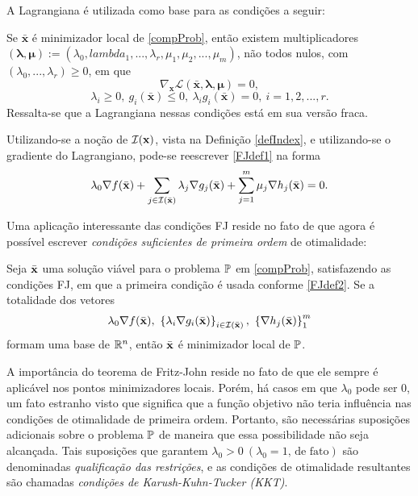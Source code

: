 A Lagrangiana \'{e} utilizada como base para as condi\c{c}\~{o}es a seguir:

\begin{theorem}
Se $\bar{\mathbf{x}}$ \'{e} minimizador local de \eqref{compProb}, ent\~{a}o existem multiplicadores $(\mathbf{\lambda,\mu}) := (\lambda_0,lambda_1,...,\lambda_r,\mu_1,\mu_2,...,\mu_m)$, n\~{a}o todos nulos, com $(\lambda_0,...,\lambda_r) \ge 0$, em que
\begin{equation}
\label{FJdef1}
\nabla_{\mathbf{x}} \mathcal{L}(\bar{\mathbf{x}},\mathbf{\lambda},\mathbf{\mu}) = 0,
\end{equation}
\begin{equation}
\lambda_i \ge 0,~ g_i(\bar{\mathbf{x}}) \le 0,~ \lambda_i g_i(\bar{\mathbf{x}}) = 0,~i = 1,2,...,r.
\end{equation}
Ressalta-se que a Lagrangiana nessas condi\c{c}\~{o}es est\'{a} em sua vers\~{a}o fraca.
\end{theorem}

Utilizando-se a no\c{c}\~{a}o de $\mathcal{I}(\mathbf{x})$, vista na Defini\c{c}\~{a}o \ref{defIndex}, e utilizando-se o gradiente do Lagrangiano, pode-se reescrever \eqref{FJdef1} na forma
\begin{equation}
\label{FJdef2}
\lambda_0 \nabla f(\bar{\mathbf{x}}) + \sum_{j \in \mathcal{I}(\bar{\mathbf{x}})} \lambda_j \nabla g_j(\bar{\mathbf{x}}) + \sum_{j=1}^{m} \mu_j \nabla h_j (\bar{\mathbf{x}}) = 0.
\end{equation}

Uma aplica\c{c}\~{a}o interessante das condi\c{c}\~{o}es FJ reside no fato de que agora \'{e} poss\'{i}vel escrever \textit{condi\c{c}\~{o}es suficientes de primeira ordem} de otimalidade:

\begin{theorem}
Seja $\bar{\mathbf{x}}$ uma solu\c{c}\~{a}o vi\'{a}vel para o problema $\mathbb{P}$ em \eqref{compProb}, satisfazendo as condi\c{c}\~{o}es FJ, em que a primeira condi\c{c}\~{a}o \'{e} usada conforme \eqref{FJdef2}. Se a totalidade dos vetores
\begin{equation*}
\lambda_0 \nabla f(\bar{\mathbf{x}}),~\left\lbrace\lambda_i \nabla g_i(\bar{\mathbf{x}})\right\rbrace_{i \in \mathcal{I}(\bar{\mathbf{x}})},~\left\lbrace\nabla h_j(\bar{\mathbf{x}})\right\rbrace_{1}^{m}
\end{equation*}
formam uma base de $\mathbb{R}^{n}$, ent\~{a}o $\bar{\mathbf{x}}$ \'{e} minimizador local de $\mathbb{P}$.
\end{theorem}

A import\^{a}ncia do teorema de Fritz-John reside no fato de que ele sempre \'{e} aplic\'{a}vel nos pontos minimizadores locais. Por\'{e}m, h\'{a} casos em que $\lambda_0$ pode ser $0$, um fato estranho visto que significa que a fun\c{c}\~{a}o objetivo n\~{a}o teria influ\^{e}ncia nas condi\c{c}\~{o}es de otimalidade de primeira ordem. Portanto, s\~{a}o necess\'{a}rias suposi\c{c}\~{o}es adicionais sobre o problema $\mathbb{P}$ de maneira que essa possibilidade n\~{a}o seja alcan\c{c}ada. Tais suposi\c{c}\~{o}es que garantem $\lambda_0 > 0 ~(\lambda_0 = 1 \text{, de fato})$ s\~{a}o denominadas \textit{qualifica\c{c}\~{a}o das restri\c{c}\~{o}es}, e as condi\c{c}\~{o}es de otimalidade resultantes s\~{a}o chamadas \textit{condi\c{c}\~{o}es de Karush-Kuhn-Tucker (KKT)}.

